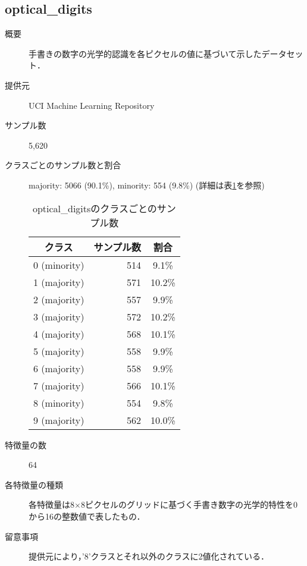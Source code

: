 \subsection{optical\_digits}
    \begin{description}
    \item[概要] 手書きの数字の光学的認識を各ピクセルの値に基づいて示したデータセット．\cite{opticaldigits}
    \item[提供元] UCI Machine Learning Repository
    \item[サンプル数] 5,620
    \item[クラスごとのサンプル数と割合] majority: 5066 (90.1\%), minority: 554 (9.8\%) (詳細は表\ref{tab:opticaldigits}を参照)
        \begin{table}[htbp]
            \centering
            \caption{optical\_digitsのクラスごとのサンプル数}
            \label{tab:opticaldigits}
            \begin{tabular}{lrc} \hline
                \multicolumn{1}{c}{クラス}&
                \multicolumn{1}{c}{サンプル数}&
                \multicolumn{1}{c}{割合}\\
                \hline
                \hline
                0 (minority)& 514 & 9.1\% \\
                1 (majority)& 571 & 10.2\% \\
                2 (majority)& 557 & 9.9\% \\
                3 (majority)& 572 & 10.2\% \\
                4 (majority)& 568 & 10.1\% \\
                5 (majority)& 558 & 9.9\% \\
                6 (majority)& 558 & 9.9\% \\
                7 (majority)& 566 & 10.1\% \\
                8 (minority)& 554 & 9.8\% \\
                9 (majority)& 562 & 10.0\% \\
                \hline
            \end{tabular}
        \end{table}
    \item[特徴量の数] 64
    \item[各特徴量の種類] \mbox{}
        各特徴量は8$\times$8ピクセルのグリッドに基づく手書き数字の光学的特性を0から16の整数値で表したもの．
    \item[留意事項] 提供元により，'8'クラスとそれ以外のクラスに2値化されている．
    \end{description}

